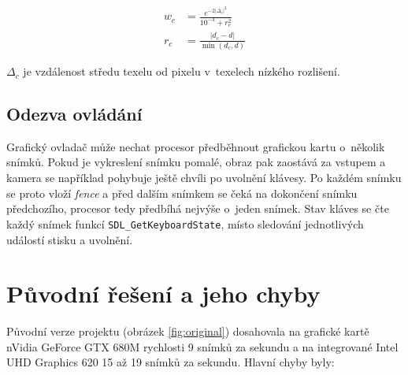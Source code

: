 \documentclass[a4paper, 12pt]{article}
\begin{document}
\begin{equation}
  \begin{aligned}
    w_c & = \frac{e^{-2 |\Delta_c|^2}}{10^{-3} + r_c^2} \\
    r_c & = \frac{|d_c - d|}{\min(d_c, d)}
  \end{aligned}
  \label{eq:upsample}
\end{equation}

$\Delta_c$ je vzdálenost středu texelu od pixelu v~texelech nízkého rozlišení.

\subsection{Odezva ovládání}

Grafický ovladač může nechat procesor předběhnout grafickou kartu o~několik
snímků. Pokud je vykreslení snímku pomalé, obraz pak zaostává za vstupem
a kamera se například pohybuje ještě chvíli po uvolnění klávesy. Po každém
snímku se proto vloží \textit{fence} a před dalším snímkem se čeká na dokončení
snímku předchozího, procesor tedy předbíhá nejvýše o~jeden snímek. Stav kláves
se čte každý snímek funkcí \texttt{SDL\_GetKeyboardState}, místo sledování
jednotlivých událostí stisku a uvolnění.


\section{Původní řešení a jeho chyby} \label{sec:original}

Původní verze projektu (obrázek \ref{fig:original}) dosahovala na grafické kartě
nVidia GeForce GTX 680M rychlosti 9 snímků za sekundu a na integrované
Intel UHD Graphics 620 15 až 19 snímků za sekundu. Hlavní chyby byly:
\end{document}
